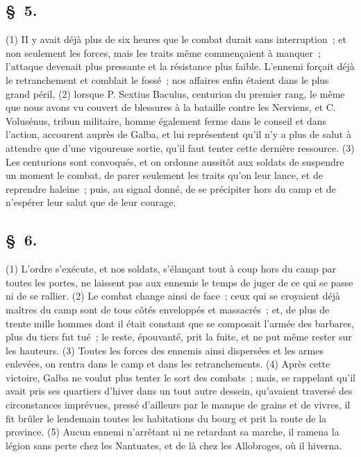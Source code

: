 \documentclass[french,twoside]{book} %
\begin{document}
\subsection[{§ 5.}]{ \textsc{§ 5.} }
\noindent (1) II y avait déjà plus de six heures que le combat durait sans interruption ; et non seulement les forces, mais les traits même commençaient à manquer ; l’attaque devenait plus pressante et la résistance plus faible. L'ennemi forçait déjà le retranchement et comblait le fossé ; nos affaires enfin étaient dans le plus grand péril, (2) lorsque P. Sextius Baculus, centurion du premier rang, le même que nous avons vu couvert de blessures à la bataille contre les Nerviens, et C. Volusénus, tribun militaire, homme également ferme dans le conseil et dans l’action, accourent auprès de Galba, et lui représentent qu’il n’y a plus de salut à attendre que d’une vigoureuse sortie, qu’il faut tenter cette dernière ressource. (3) Les centurions sont convoqués, et on ordonne aussitôt aux soldats de suspendre un moment le combat, de parer seulement les traits qu’on leur lance, et de reprendre haleine ; puis, au signal donné, de se précipiter hors du camp et de n’espérer leur salut que de leur courage.
\subsection[{§ 6.}]{ \textsc{§ 6.} }
\noindent (1) L'ordre s’exécute, et nos soldats, s’élançant tout à coup hors du camp par toutes les portes, ne laissent pas aux ennemis le temps de juger de ce qui se passe ni de se rallier. (2) Le combat change ainsi de face ; ceux qui se croyaient déjà maîtres du camp sont de tous côtés enveloppés et massacrés ; et, de plus de trente mille hommes dont il était constant que se composait l’armée des barbares, plus du tiers fut tué ; le reste, épouvanté, prit la fuite, et ne put même rester sur les hauteurs. (3) Toutes les forces des ennemis ainsi dispersées et les armes enlevées, on rentra dans le camp et dans les retranchements. (4) Après cette victoire, Galba ne voulut plus tenter le sort des combats ; mais, se rappelant qu’il avait pris ses quartiers d’hiver dans un tout autre dessein, qu’avaient traversé des circonstances imprévues, pressé d’ailleurs par le manque de grains et de vivres, il fit brûler le lendemain toutes les habitations du bourg et prit la route de la province. (5) Aucun ennemi n’arrêtant ni ne retardant sa marche, il ramena la légion sans perte chez les Nantuates, et de là chez les Allobroges, où il hiverna.
\end{document}
